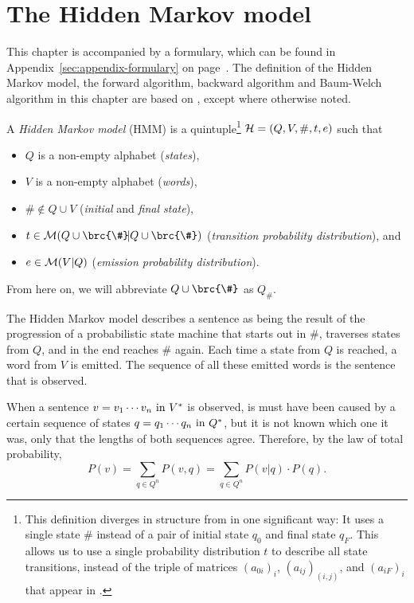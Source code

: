 \chapter{The Hidden Markov model}

This chapter is accompanied by a formulary, which can be found in
Appendix~\ref{sec:appendix-formulary} on page~\pageref{sec:appendix-formulary}.
The definition of the Hidden Markov model, the forward algorithm, backward
algorithm and Baum-Welch algorithm in this chapter are based on
\cite[pp.~210]{jm09}, except where otherwise noted.

\begin{definition}
 A \emph{Hidden Markov model} (HMM) is a quintuple\footnote{This definition
 diverges in structure from \cite{jm09} in one significant way: It uses a
 single state $\#$ instead of a pair of initial state $q_0$ and final state
 $q_F$. This allows us to use a single probability distribution $t$ to describe
 all state transitions, instead of the triple of matrices $(a_{0i})_i$,
 $(a_{ij})_{(i,j)}$, and $(a_{iF})_i$ that appear in \cite{jm09}.} $\mathcal H =
 (Q,V,\#,t,e)$ such that
 \begin{itemize}\setlength\itemsep{-0.3em}
  \item $Q$ is a non-empty alphabet (\emph{states}),
  \item $V$ is a non-empty alphabet (\emph{words}),
  \item $\#\notin Q\cup V$ (\emph{initial} and \emph{final state}),
  \item $t\in\um(Q\cup\brc{\#}\!|Q\cup\brc{\#})$ (\emph{transition probability distribution}), and
  \item $e\in\mathcal M(V|Q)$ (\emph{emission probability distribution}). \qedhere
 \end{itemize}
\end{definition}

From here on, we will abbreviate $Q\cup\brc{\#}$ as $Q_\#$.

The Hidden Markov model describes a sentence as being the result of the
progression of a probabilistic state machine that starts out in $\#$, traverses
states from $Q$, and in the end reaches $\#$ again. Each time a state from $Q$
is reached, a word from $V$ is emitted. The sequence of all these emitted words
is the sentence that is observed.

When a sentence $v = v_1\cdots v_n\text{ in } V^*$ is observed, is must have been
caused by a certain sequence of states $q = q_1\cdots q_n\text{ in } Q^*$, but it is
not known which one it was, only that the lengths of both sequences agree.
Therefore, by the law of total probability,
\[
 P(v) = \sum_{q\in Q^n} P(v,q) = \sum_{q\in Q^n} P(v|q) \cdot P(q).
\]


